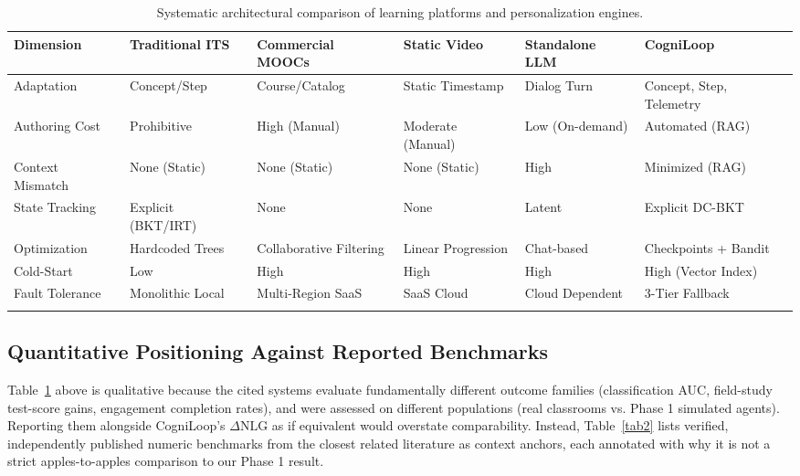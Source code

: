 \documentclass[pdflatex,sn-apa]{sn-jnl}
\begin{document}
\begin{table}[h]
\caption{Systematic architectural comparison of learning platforms and personalization engines.}\label{tab1}
\footnotesize
\begin{tabular}{@{}p{1.7cm}p{1.8cm}p{1.9cm}p{1.6cm}p{1.7cm}p{2.1cm}@{}}
\toprule
Dimension & Traditional ITS & Commercial MOOCs & Static Video & Standalone LLM & CogniLoop \\
\midrule
Adaptation & Concept/Step & Course/Catalog & Static Timestamp & Dialog Turn & Concept, Step, Telemetry \\
Authoring Cost & Prohibitive & High (Manual) & Moderate (Manual) & Low (On-demand) & Automated (RAG) \\
Context Mismatch & None (Static) & None (Static) & None (Static) & High & Minimized (RAG) \\
State Tracking & Explicit (BKT/IRT) & None & None & Latent & Explicit DC-BKT \\
Optimization & Hardcoded Trees & Collaborative Filtering & Linear Progression & Chat-based & Checkpoints + Bandit \\
Cold-Start & Low & High & High & High & High (Vector Index) \\
Fault Tolerance & Monolithic Local & Multi-Region SaaS & SaaS Cloud & Cloud Dependent & 3-Tier Fallback \\
\botrule
\end{tabular}
\end{table}

\subsection{Quantitative Positioning Against Reported Benchmarks}\label{sec2.5}

Table~\ref{tab1} above is qualitative because the cited systems evaluate fundamentally different outcome families (classification AUC, field-study test-score gains, engagement completion rates), and were assessed on different populations (real classrooms vs. Phase 1 simulated agents). Reporting them alongside CogniLoop's $\Delta\text{NLG}$ as if equivalent would overstate comparability. Instead, Table~\ref{tab2} lists verified, independently published numeric benchmarks from the closest related literature as context anchors, each annotated with why it is not a strict apples-to-apples comparison to our Phase 1 result.
\end{document}

